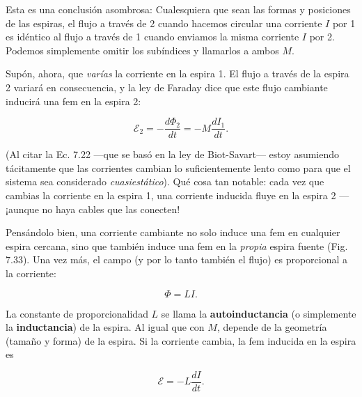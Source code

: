 \documentclass[12pt,a4paper]{report}
\newcommand{\esp}{\vspace{0.5cm}}
\begin{document}
	\esp
	
	Esta es una conclusión asombrosa: Cualesquiera que sean las formas y posiciones de las espiras, el flujo a través de 2 cuando hacemos circular una corriente $I$ por 1 es idéntico al flujo a través de 1 cuando enviamos la misma corriente $I$ por 2. Podemos simplemente omitir los subíndices y llamarlos a ambos $M$.
	
	\esp
	
	Supón, ahora, que \textit{varías} la corriente en la espira 1. El flujo a través de la espira 2 variará en consecuencia, y la ley de Faraday dice que este flujo cambiante inducirá una fem en la espira 2:
	
	\esp
	
	\begin{equation}
		\mathcal{E}_2 = -\frac{d\Phi_2}{dt} = -M \frac{dI_1}{dt}. \tag{7.25}
	\end{equation}
	
	\esp
	
	(Al citar la Ec. 7.22 —que se basó en la ley de Biot-Savart— estoy asumiendo tácitamente que las corrientes cambian lo suficientemente lento como para que el sistema sea considerado \textit{cuasiestático}). Qué cosa tan notable: cada vez que cambias la corriente en la espira 1, una corriente inducida fluye en la espira 2 —¡aunque no haya cables que las conecten!
	
	\esp
	
	Pensándolo bien, una corriente cambiante no solo induce una fem en cualquier espira cercana, sino que también induce una fem en la \textit{propia} espira fuente (Fig. 7.33). Una vez más, el campo (y por lo tanto también el flujo) es proporcional a la corriente:
	
	\esp
	
	\begin{equation}
		\Phi = LI. \tag{7.26}
	\end{equation}
	
	\esp
	
	La constante de proporcionalidad $L$ se llama la \textbf{autoinductancia} (o simplemente la \textbf{inductancia}) de la espira. Al igual que con $M$, depende de la geometría (tamaño y forma) de la espira. Si la corriente cambia, la fem inducida en la espira es
	
	\esp
	
	\begin{equation}
		\mathcal{E} = -L \frac{dI}{dt}. \tag{7.27}
	\end{equation}
	
\end{document}
